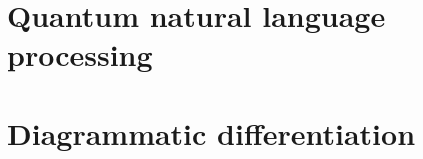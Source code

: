 
\chapter{Quantum natural language processing}

\chapter{Diagrammatic differentiation}
\label{chapter-3:diag-diff}

% 
% 
% 
% 
% 
% 

